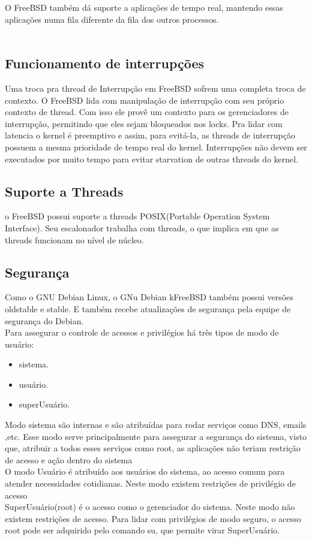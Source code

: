 \documentclass[conference]{IEEEtran}
\begin{document}
O FreeBSD também dá suporte a aplicações de tempo real, mantendo essas aplicações numa fila diferente da fila dos outros processos.\cite{DesignImplementationFreeBSD}\\ \\
\subsection{Funcionamento de interrupções}\label{sec:BSDInt}
Uma troca pra thread de Interrupção em FreeBSD sofrem uma completa troca de contexto. O FreeBSD lida com manipulação de interrupção com seu próprio contexto de thread. Com isso ele provê um contexto para os gerenciadores de interrupção, permitindo que eles sejam bloqueados nos locks. Pra lidar com latencia o kernel é preemptivo e assim, para evitá-la, as threads de interrupção possuem a mesma prioridade de tempo real do kernel. Interrupções não devem ser executados por muito tempo para evitar starvation de outras threads do kernel. \\
\subsection{Suporte a Threads}\label{sec:BSDThreads}
o FreeBSD possui suporte a threads POSIX(Portable Operation System Interface). Seu escalonador trabalha com threads, o que implica em que as threads funcionam no nível de núcleo.\cite{DesignImplementationFreeBSD}
\subsection{Segurança}\label{sec:BSDSec}
Como o GNU Debian Linux, o GNu Debian kFreeBSD também possui versões oldstable e stable. E também recebe atualizações de segurança pela equipe de segurança do Debian.\cite{DebiankFreeBSDVersions}\\
Para assegurar o controle de acessos e privilégios há três tipos de modo de usuário:
\begin{itemize}
	\item sistema.
	\item usuário.
	\item superUsuário.
\end{itemize}

Modo sistema são internas e são atribuídas para rodar serviços como DNS, emails ,etc. Esse modo serve principalmente para assegurar a segurança do sistema, visto que, atribuir a todos esses serviços como root, as aplicações não teriam restrição de acesso e ação dentro do sistema \\
O modo Usuário é atribuído aos usuários do sistema, ao acesso comum para atender necessidades cotidianas. Neste modo existem restrições de privilégio de acesso \\
SuperUsuário(root) é o acesso como o gerenciador do sistema. Neste modo não existem restrições de acesso. Para lidar com privilégios de modo seguro, o acesso root pode ser adquirido pelo comando su, que permite virar SuperUsuário. \\
\end{document}
